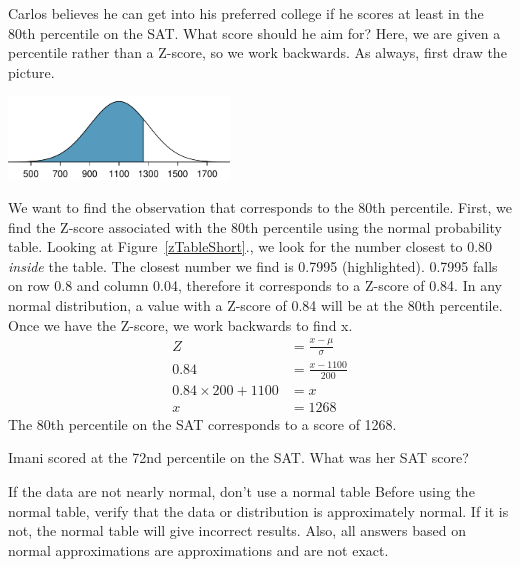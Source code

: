 \begin{examplewrap}
\begin{nexample}{Carlos believes he can get into his preferred college if he scores at least in the 80th percentile on the SAT. What score should he aim for?}
Here, we are given a percentile rather than a Z-score, so we work backwards. As always, first draw the picture.
\begin{center}
\includegraphics[height=22mm]{ch_distributions/figures/sat80thPercentile/sat80thPercentile}
\end{center}
We want to find the observation that corresponds to the 80th percentile. First, we find the Z-score associated with the 80th percentile using the normal probability table. Looking at Figure~\ref{zTableShort}., we look for the number closest to 0.80 \emph{inside} the table. The closest number we find is 0.7995 (highlighted). 0.7995 falls on row 0.8 and column 0.04, therefore it corresponds to a Z-score of 0.84. In any normal distribution, a value with a Z-score of 0.84 will be at the 80th percentile. Once we have the Z-score, we work backwards to find x.
\begin{align*}
Z &= \frac{x-\mu}{\sigma} \\
0.84 &= \frac{x-1100}{200} \\
0.84 \times 200+1100 &= x \\
x& = 1268
\end{align*}
The 80th percentile on the SAT corresponds to a score of 1268.
\end{nexample}
\end{examplewrap}

\begin{exercisewrap}
\begin{nexercise}Imani scored at the 72nd percentile on the SAT. What was her SAT score?\footnotemark\end{nexercise}
\end{exercisewrap}


\begin{onebox}{If the data are not nearly normal, don't use a normal table}
{Before using the normal table, verify that the data or distribution is approximately normal. If it is not, the normal table will give incorrect results. Also, all answers based on normal approximations are approximations and are not exact.}
\end{onebox}



